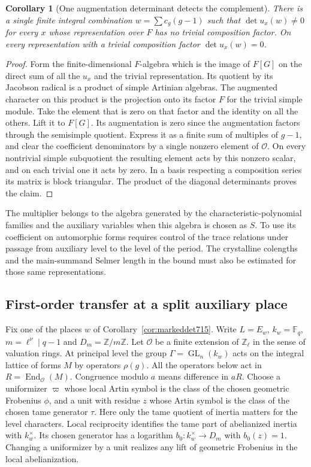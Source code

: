 \documentclass[a4paper,11pt]{article}
\newtheorem{corollary}[proposition]{Corollary}
\theoremstyle{definition}
\theoremstyle{remark}
\newcommand{\ZZ}{\mathbb Z}\newcommand{\ord}{\operatorname{ord}}
\numberwithin{equation}{section}
\newcommand{\GL}{\operatorname{GL}}
\begin{document}
\begin{corollary}[One augmentation determinant detects the complement]
\leavevmode\label{cor:augdet720}
There is a single finite integral combination \(w=\sum c_g(g-1)\)
such that \(\det u_x(w)\ne0\) for every \(x\) whose representation
over \(F\) has no trivial composition factor. On every
representation with a trivial composition factor
\(\det u_x(w)=0\).
\end{corollary}
\begin{proof}
Form the finite-dimensional \(F\)-algebra which is the image
of \(F[G]\) on the direct sum of all the \(u_x\) and the trivial
representation. Its quotient by its Jacobson radical is a product
of simple Artinian algebras. The augmented character on this
product is the projection onto its factor \(F\) for the trivial
simple module. Take the element that is zero on that factor
and the identity on all the others. Lift it to \(F[G]\).
Its augmentation is zero since the augmentation factors
through the semisimple quotient. Express it as a finite sum
of multiples of \(g-1\), and clear the coefficient denominators
by a single nonzero element of \(\mathcal O\). On every
nontrivial simple subquotient the resulting element acts
by this nonzero scalar, and on each trivial one it acts by
zero. In a basis respecting a composition series its matrix
is block triangular. The product of the diagonal determinants
proves the claim.
\end{proof}

The multiplier belongs to the algebra generated by the
characteristic-polynomial families and the auxiliary variables
when this algebra is chosen as \(S\). To use its coefficient
on automorphic forms requires control of the trace relations under
passage from auxiliary level to the level of the period. The
crystalline colengths and the main-summand Selmer length in
the bound must also be estimated for those same representations.
\clearpage


\subsection{First-order transfer at a split auxiliary place}
\label{sec:auxtransfer721}

Fix one of the places \(w\) of Corollary~\ref{cor:markeddet715}.
Write \(L=E_w\), \(k_w=\mathbb F_q\), \(m=\ell^\nu\mid q-1\)
and \(D_m=\ZZ/m\ZZ\). Let \(\mathcal O\) be a finite extension
of \(\ZZ_\ell\) in the sense of valuation rings. At principal
level the group \(\Gamma=\GL_n(k_w)\) acts on the integral
lattice of forms \(M\) by operators \(\rho(g)\). All the
operators below act in \(R=\operatorname{End}_{\mathcal O}(M)\).
Congruence modulo \(a\) means difference in \(aR\).
Choose a uniformizer \(\varpi\) whose local Artin symbol is the
class of the chosen geometric Frobenius \(\phi\), and a unit
with residue \(z\) whose Artin symbol is the class of the chosen
tame generator \(\tau\). Here only the tame quotient of inertia
matters for the level characters. Local reciprocity identifies
the tame part of abelianized inertia with \(k_w^\times\). Its
chosen generator has a logarithm
\(b_0:k_w^\times\to D_m\) with \(b_0(z)=1\).
Changing a uniformizer by a unit realizes any lift of geometric
Frobenius in the local abelianization.
\end{document}
